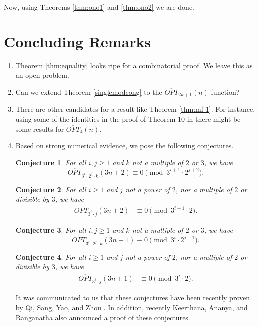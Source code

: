 \documentclass[12pt,reqno]{amsart}
\numberwithin{equation}{section}
\newcommand{\opt}{\overline{OPT}}
\newtheorem{conjecture}{Conjecture}[section]
\begin{document}
\noindent Now, using Theorems \ref{thm:ono1} and \ref{thm:ono2} we are done. 

\section{Concluding Remarks}\label{sec:conc}

\begin{enumerate}
\item Theorem \ref{thm:equality} looks ripe for a combinatorial proof. We leave this as an open problem.
\item Can we extend Theorem \ref{singlemodcong} to the $\opt_{2k+1}(n)$ function?
    \item There are other candidates for a result like Theorem \ref{thm:mf-1}. For instance, using some of the identities in the proof of Theorem 10 in \cite{SSS} there might be some results for $\opt_4(n)$.
    \item Based on strong numerical evidence, we pose the following conjectures.
\begin{conjecture}
    For all $i,j\geq 1$ and $k$ not a multiple of $2$ or $3$, we have
\[
    \opt_{3^i\cdot 2^j\cdot k}(3n+2)\equiv 0\pmod {3^{i+1}\cdot 2^{j+2}}.
\]
\end{conjecture}

\begin{conjecture}
    For all $i\geq 1$ and $j$ not a power of $2$, nor a multiple of $2$ or divisible by $3$, we have
\begin{align*}
  \opt_{3^i\cdot j}(3n+2)&\equiv 0\pmod {3^{i+1}\cdot 2}.
\end{align*}
\end{conjecture}

\begin{conjecture}
    For all $i,j\geq 1$ and $k$ not a multiple of $2$ or $3$, we have
\[
    \opt_{3^i\cdot 2^j\cdot k}(3n+1)\equiv 0\pmod {3^{i}\cdot 2^{j+1}}.
\]
\end{conjecture}

\begin{conjecture}
    For all $i\geq 1$ and $j$ not a power of $2$, nor a multiple of $2$ or divisible by $3$, we have
\begin{align*}
  \opt_{3^i\cdot j}(3n+1)&\equiv 0\pmod {3^{i}\cdot 2}.
\end{align*}
\end{conjecture}
\noindent It was communicated to us that these conjectures have been recently proven by Qi, Sang, Yao, and Zhou \cite{QiSangYaoZhou}. In addition, recently Keerthana, Ananya, and Ranganatha \cite{arxivnew} also announced a proof of these conjectures.
\end{enumerate}
\end{document}
